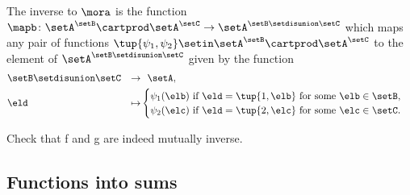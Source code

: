 The inverse to $\mora$ is the function $\mapb \colon \setA^\setB \cartprod \setA^\setC \to \setA^{\setB \setdisunion \setC}$ which maps any pair of functions $\tup{\psi_1, \psi _2} \setin \setA^\setB \cartprod \setA^\setC$ to the element of $\setA^{\setB \setdisunion \setC}$ given by the function
\begin{equation}
\begin{aligned}
   & \setB \setdisunion \setC & \to & \ \ \setA , \\
         & \eld & \mapsto & \begin{cases} \psi_1(\elb) \text{ if } \eld = \tup{1,\elb} \text{ for some } \elb \in \setB, \\
          \psi_2(\elc)\text{ if } \eld = \tup{2, \elc}  \text{ for some } \elc \in \setC. \end{cases}
\end{aligned}
\end{equation}

\begin{gradedexercise}
Check that f and g are indeed mutually inverse. 
\end{gradedexercise}



\subsection{Functions into sums}

